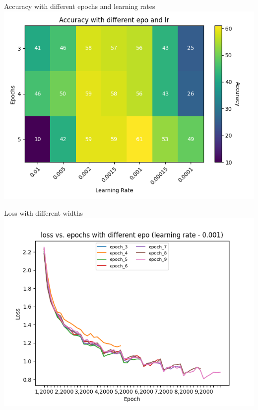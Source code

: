 \begin{frame}{Accuracy with different epochs and learning rates}
    \includegraphics[scale=.6]{images/accuracy with different epo and lr.png}
\end{frame}

\begin{frame}{Loss with different widths}
    \includegraphics[scale=.6]{images/loss vs. epochs with different epo (learning rate - 0.001).png}
\end{frame}

